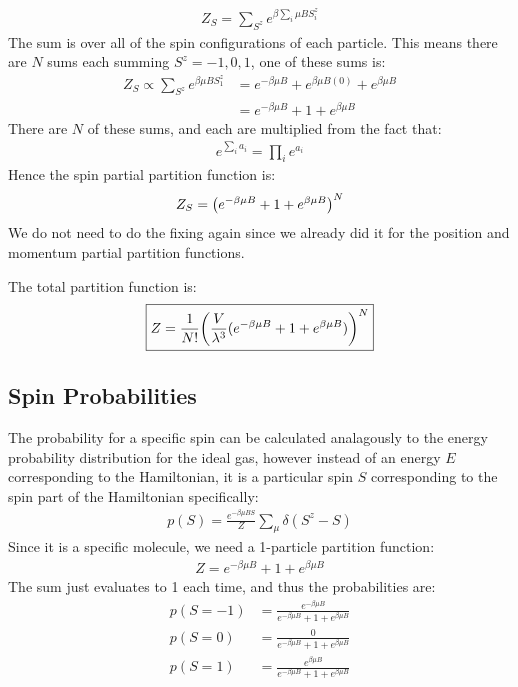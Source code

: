 \documentclass[12pt]{article}
\begin{document}
\begin{align*}
  Z_S=\sum_{S^z}e^{\beta\sum_i\mu BS_i^z}
\end{align*}
The sum is over all of the spin configurations of each particle. This means there are $N$ sums each summing $S^z=-1,0,1$, one of these sums is:
\begin{align*}
  Z_S\propto\sum_{S^z}e^{\beta\mu BS^z_1}&=
  e^{-\beta\mu B}+e^{\beta\mu B(0)}+e^{\beta\mu B}\\
  &=e^{-\beta\mu B}+1+e^{\beta\mu B}
\end{align*}
There are $N$ of these sums, and each are multiplied from the fact that:
\begin{align*}
  e^{\sum_ia_i}=\prod_ie^{a_i}
\end{align*}
Hence the spin partial partition function is:
\begin{align*}
  Z_S=\qty(e^{-\beta\mu B}+1+e^{\beta\mu B})^N
\end{align*}
We do not need to do the fixing again since we already did it for the position and momentum partial partition functions.

The total partition function is:
\begin{align}
  \boxed{
    Z=\frac{1}{N!}\qty(\frac{V}{\lambda^3}(e^{-\beta\mu B}+1+e^{\beta\mu B}))^N
  }
\end{align}
\subsection{Spin Probabilities}
The probability for a specific spin can be calculated analagously to the energy probability distribution for the ideal gas, however instead of an energy $E$ corresponding to the Hamiltonian, it is a particular spin $S$ corresponding to the spin part of the Hamiltonian specifically:
\begin{align*}
  p(S)=\frac{e^{-\beta\mu B S}}{Z}\sum_\mu\delta(S^z-S)
\end{align*}
Since it is a specific molecule, we need a 1-particle partition function:
\begin{align*}
  Z=e^{-\beta\mu B}+1+e^{\beta\mu B}
\end{align*}
The sum just evaluates to 1 each time, and thus the probabilities are:
\begin{equation}
  \boxed{
  \begin{aligned}
    p(S=-1)&=\frac{e^{-\beta\mu B}}{e^{-\beta\mu B}+1+e^{\beta\mu B}}\\
    p(S= 0)&=\frac0{e^{-\beta\mu B}+1+e^{\beta\mu B}}\\
    p(S= 1)&=\frac{e^{\beta\mu B}}{e^{-\beta\mu B}+1+e^{\beta\mu B}}
  \end{aligned}
  }
\end{equation}
\end{document}

